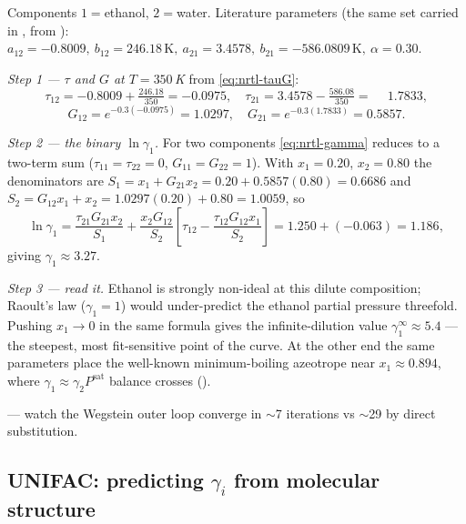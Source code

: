 \documentclass[11pt,a4paper]{article}
\begin{document}
\begin{example}[NRTL $\gamma$ for ethanol/water at 350\,K, $x_1 = 0.20$]
Components $1=$ethanol, $2=$water. Literature parameters (the same set
carried in ,
from \cite{RPP}):
$a_{12} = -0.8009,\ b_{12} = 246.18\,\mathrm{K},\ a_{21} = 3.4578,\
b_{21} = -586.0809\,\mathrm{K},\ \alpha = 0.30$.

\emph{Step 1 --- $\tau$ and $G$ at $T = 350\,$K} from
\eqref{eq:nrtl-tauG}:
\[
\tau_{12} = -0.8009 + \tfrac{246.18}{350} = -0.0975, \quad
\tau_{21} =  3.4578 - \tfrac{586.08}{350} = \phantom{-}1.7833,
\]
\[
G_{12} = e^{-0.3(-0.0975)} = 1.0297, \quad
G_{21} = e^{-0.3(1.7833)}  = 0.5857.
\]

\emph{Step 2 --- the binary $\ln\gamma_1$.} For two components
\eqref{eq:nrtl-gamma} reduces to a two-term sum
($\tau_{11}=\tau_{22}=0$, $G_{11}=G_{22}=1$). With $x_1=0.20$,
$x_2=0.80$ the denominators are
$S_1 = x_1 + G_{21}x_2 = 0.20 + 0.5857(0.80) = 0.6686$ and
$S_2 = G_{12}x_1 + x_2 = 1.0297(0.20) + 0.80 = 1.0059$, so
\[
\ln\gamma_1
= \frac{\tau_{21}G_{21}x_2}{S_1}
+ \frac{x_2 G_{12}}{S_2}\!\left[\tau_{12}-\frac{\tau_{12}G_{12}x_1}{S_2}\right]
= 1.250 + (-0.063) = 1.186,
\]
giving $\gamma_1 \approx 3.27$.

\emph{Step 3 --- read it.} Ethanol is strongly non-ideal at this
dilute composition; Raoult's law ($\gamma_1=1$) would under-predict the
ethanol partial pressure threefold. Pushing $x_1\to0$ in the same
formula gives the infinite-dilution value $\gamma_1^\infty \approx 5.4$
--- the steepest, most fit-sensitive point of the curve. At the other
end the same parameters place the well-known minimum-boiling azeotrope
near $x_1 \approx 0.894$, where $\gamma_1\approx\gamma_2 P^{\text{sat}}$
balance crosses ().
\end{example}

\begin{tutoriallink}
 --- watch the
Wegstein outer loop converge in $\sim$7 iterations vs $\sim$29 by direct
substitution.
\end{tutoriallink}

\subsection{UNIFAC: predicting $\gamma_i$ from molecular
structure}\label{sec:unifac}
\end{document}
